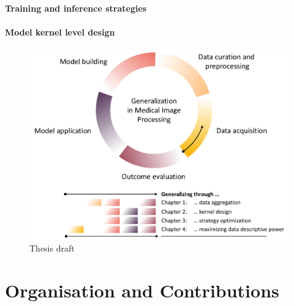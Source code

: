        \paragraph{Training and inference strategies}
        \paragraph{Model kernel level design}
        \begin{figure}
            \label{fig:draft}
            \includegraphics[width=\textwidth]{sections/01_introduction/figures/draft.pdf}
            \caption{Thesis draft}
        \end{figure}



\section{Organisation and Contributions}  %

    \noindent{}

    \noindent{}

    \noindent{}
    \noindent{}